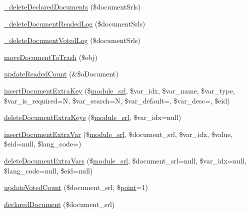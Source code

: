 \begin{DoxyCompactItemize}
\item 
\hyperlink{classdocumentController_a2514acfe313b7ddd5daccb50557d38b5}{\+\_\+delete\+Declared\+Documents} (\$document\+Srls)
\item 
\hyperlink{classdocumentController_ac055fa2cc48de200d0b319eddd7a13da}{\+\_\+delete\+Document\+Readed\+Log} (\$document\+Srls)
\item 
\hyperlink{classdocumentController_a9fe391d1b1ece3b7b16d15976c1622d0}{\+\_\+delete\+Document\+Voted\+Log} (\$document\+Srls)
\item 
\hyperlink{classdocumentController_a3f861f8df6113ca3211c48be3c49f305}{move\+Document\+To\+Trash} (\$obj)
\item 
\hyperlink{classdocumentController_a437461a6588e59e038ed54316bfa7893}{update\+Readed\+Count} (\&\$o\+Document)
\item 
\hyperlink{classdocumentController_afcd76c7834433cdcd2178bfc8895dcae}{insert\+Document\+Extra\+Key} (\$\hyperlink{ko_8install_8php_a370bb6450fab1da3e0ed9f484a38b761}{module\+\_\+srl}, \$var\+\_\+idx, \$var\+\_\+name, \$var\+\_\+type, \$var\+\_\+is\+\_\+required=\textquotesingle{}N\textquotesingle{}, \$var\+\_\+search=\textquotesingle{}N\textquotesingle{}, \$var\+\_\+default=\textquotesingle{}\textquotesingle{}, \$var\+\_\+desc=\textquotesingle{}\textquotesingle{}, \$eid)
\item 
\hyperlink{classdocumentController_a279894a3cef824bc940cda67ced511aa}{delete\+Document\+Extra\+Keys} (\$\hyperlink{ko_8install_8php_a370bb6450fab1da3e0ed9f484a38b761}{module\+\_\+srl}, \$var\+\_\+idx=null)
\item 
\hyperlink{classdocumentController_aafdea39afeedae2b85cc0957701fb388}{insert\+Document\+Extra\+Var} (\$\hyperlink{ko_8install_8php_a370bb6450fab1da3e0ed9f484a38b761}{module\+\_\+srl}, \$document\+\_\+srl, \$var\+\_\+idx, \$value, \$eid=null, \$lang\+\_\+code=\textquotesingle{}\textquotesingle{})
\item 
\hyperlink{classdocumentController_a1ebb5684cf99ea4044fa476c6d006bd2}{delete\+Document\+Extra\+Vars} (\$\hyperlink{ko_8install_8php_a370bb6450fab1da3e0ed9f484a38b761}{module\+\_\+srl}, \$document\+\_\+srl=null, \$var\+\_\+idx=null, \$lang\+\_\+code=null, \$eid=null)
\item 
\hyperlink{classdocumentController_aca82ae9abe825d3ee6182d3608e71e31}{update\+Voted\+Count} (\$document\+\_\+srl, \$\hyperlink{classpoint}{point}=1)
\item 
\hyperlink{classdocumentController_aa2cdd129c5f882d535e39728761d4168}{declared\+Document} (\$document\+\_\+srl)

\end{DoxyCompactItemize}
